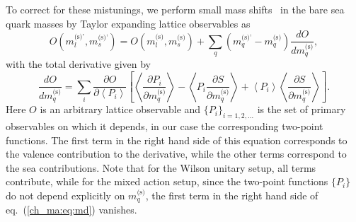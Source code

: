 To correct for these mistunings, we perform small mass shifts~\citep{Bruno:2016plf} in the bare sea quark masses by Taylor expanding lattice observables as
\begin{equation}
\label{ch_ma:eq:mass_shift}
{O}\left(m_l^{\textrm{(s)'}},m_s^{\textrm{(s)'}}\right)={O}\left(m_l^{\textrm{(s)}},m_s^{\textrm{(s)}}\right)+\sum_q\left(m_q^{\textrm{(s)'}}-m_q^{\textrm{(s)}}\right)\frac{d{O}}{dm_q^{\textrm{(s)}}},
\end{equation}
with the total derivative given by
\begin{equation}
\label{ch_ma:eq:md}
\frac{d{O}}{dm_q^{\textrm{(s)}}}=\sum_i\frac{\partial{O}}{\partial \left<P_i\right>}\left[\left<\frac{\partial P_i}{\partial m_q^{\textrm{(s)}}}\right>-\left<P_i\frac{\partial S}{\partial m_q^{\textrm{(s)}}}\right>+\left<P_i\right>\left<\frac{\partial S}{\partial m_q^{\textrm{(s)}}}\right>\right].
\end{equation}
Here ${O}$ is an arbitrary lattice observable and $\{P_i\}_{i=1,2,...}$ is the set of primary observables on which it depends, in our case the corresponding two-point functions. The first term in the right hand side of this equation corresponds to the valence contribution to the derivative, while the other terms correspond to the sea contributions. Note that for the Wilson unitary setup, all terms contribute, while for the mixed action setup, since the two-point functions $\{P_i\}$ do not depend explicitly on $m_q^{\textrm{(s)}}$, the first term in the right hand side of eq.~(\ref{ch_ma:eq:md}) vanishes.

